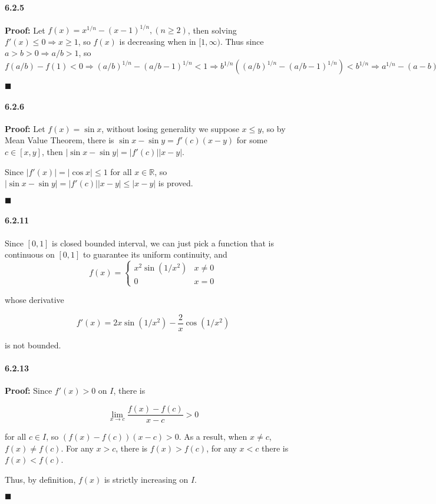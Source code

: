 \documentclass[11pt]{article}
\newcommand{\qed}{
	\begin{flushright}
		$\blacksquare$
	\end{flushright}}
\begin{document}
	\paragraph{6.2.5}\textbf{Proof:}
		Let $f(x) = x^{1/n} - (x - 1)^{1/n}, (n \geq 2)$, then solving $f'(x) \leq 0 \Rightarrow x \geq 1$, so $f(x)$ is decreasing when in $[1, \infty)$. Thus since $a > b > 0 \Rightarrow a/b > 1$, so $f(a/b) - f(1) < 0 \Rightarrow (a/b)^{1/n} - (a/b - 1)^{1/n} < 1 \Rightarrow b^{1/n}((a/b)^{1/n} - (a/b - 1)^{1/n}) < b^{1/n} \Rightarrow a^{1/n} - (a - b)^{1/n} < b^{1/n} \Rightarrow  a^{1/n} - b^{1/n} < (a - b)^{1/n}$
		\qed 
	\paragraph{6.2.6}\textbf{Proof:}
		Let $f(x) = \sin x$, without losing generality we suppose $x \leq y$, so by Mean Value Theorem, there is $\sin x - \sin y = f'(c)(x - y)$ for some $c \in [x, y]$, then $|\sin x - \sin y| = |f'(c)||x - y|$.
		
		Since $|f'(x)| = |\cos x| \leq 1$ for all $x \in \mathbb{R}$, so $|\sin x - \sin y| = |f'(c)||x - y| \leq |x - y|$ is proved.
		\qed
	\paragraph{6.2.11}
	Since $[0, 1]$ is closed bounded interval, we can just pick a function that is continuous on $[0, 1]$ to guarantee its uniform continuity, and  
		\[f(x) =  \begin{cases}
			x^2 \sin(1/x^2) & x \neq 0\\
			0 & x = 0
		\end{cases} \]
		
		whose derivative
		
		\[f'(x) = 2x\sin(1/x^2) - \frac{2}{x}\cos(1/x^2)\]
		
		is not bounded.
		
	\paragraph{6.2.13}\textbf{Proof:}
		Since $f'(x) > 0$ on $I$, there is
		
		\[\lim_{x\rightarrow c} \frac{f(x) - f(c)}{x - c} > 0\]
		
		for all $c \in I$, so $(f(x) - f(c))(x - c) > 0$. As a result, when $x \neq c$, $f(x) \neq f(c)$. For any $x > c$, there is $f(x) > f(c)$, for any $x < c$ there is $f(x) < f(c)$.
		
		Thus, by definition, $f(x)$ is strictly increasing on $I$.
		\qed
		
\end{document}
